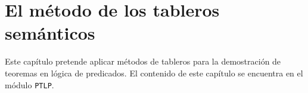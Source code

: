 \chapter{El método de los tableros semánticos}
\label{sec:tableros}

Este capítulo pretende aplicar métodos de tableros para la demostración
de teoremas en lógica de predicados. El contenido de este capítulo
se encuentra en el módulo \texttt{PTLP}.


